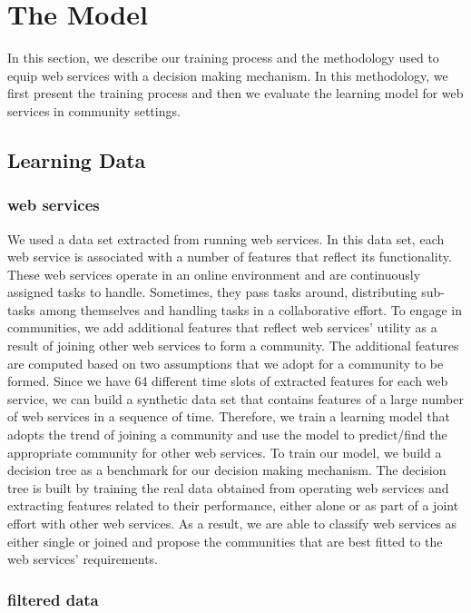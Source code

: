 \documentclass[10pt,journal,cspaper,compsoc]{IEEEtran}
\begin{document}
\section{The Model}\label{s:model}

In this section, we describe our training process and the methodology used to equip web services with a decision making mechanism. In this methodology, we first present the training process and then we evaluate the learning model for web services in community settings.

\subsection{Learning Data}\label{ss:learningdata}

\subsubsection{web services}\label{sss:webservices}

We used a data set extracted from running web services. In this data set, each web service is associated with a number of features that reflect its functionality. These web services operate in an online environment and are continuously assigned tasks to handle. Sometimes, they pass tasks around, distributing sub-tasks among themselves and handling tasks in a collaborative effort. To engage in communities, we add additional features that reflect web services' utility as a result of joining other web services to form a community. The additional features are computed based on two assumptions that we adopt for a community to be formed. Since we have 64 different time slots of extracted features for each web service, we can build a synthetic data set that contains features of a large number of web services in a sequence of time. Therefore, we train a learning model that adopts the trend of joining a community and use the model to predict/find the appropriate community for other web services. To train our model, we build a decision tree as a benchmark for our decision making mechanism. The decision tree is built by training the real data obtained from operating web services and extracting features related to their performance, either alone or as part of a joint effort with other web services. As a result, we are able to classify web services as either single or joined and propose the communities that are best fitted to the web services' requirements.

\subsubsection{filtered data}\label{sss:filtereddata}
\end{document}

